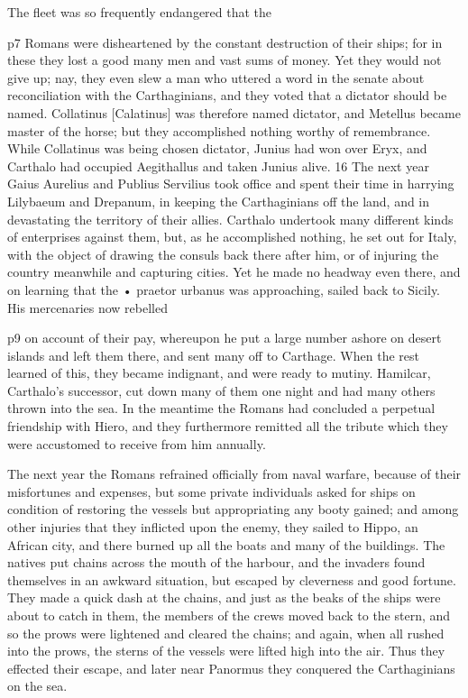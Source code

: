 The fleet was so frequently endangered that the

p7 Romans were disheartened by the constant destruction of their ships; for in these they lost a good many men and vast sums of money. Yet they would not give up; nay, they even slew a man who uttered a word in the senate about reconciliation with the Carthaginians, and they voted that a dictator should be named. Collatinus [Calatinus] was therefore named dictator, and Metellus became master of the horse; but they accomplished nothing worthy of remembrance. While Collatinus was being chosen dictator, Junius had won over Eryx, and Carthalo had occupied Aegithallus and taken Junius alive. 16
The next year Gaius Aurelius and Publius Servilius took office and spent their time in harrying Lilybaeum and Drepanum, in keeping the Carthaginians off the land, and in devastating the territory of their allies. Carthalo undertook many different kinds of enterprises against them, but, as he accomplished nothing, he set out for Italy, with the object of drawing the consuls back there after him, or of injuring the country meanwhile and capturing cities. Yet he made no headway even there, and on learning that the
\texthebrew{•} praetor urbanus was approaching, sailed back to Sicily. His mercenaries now rebelled

p9 on account of their pay, whereupon he put a large number ashore on desert islands and left them there, and sent many off to Carthage. When the rest learned of this, they became indignant, and were ready to mutiny. Hamilcar, Carthalo's successor, cut down many of them one night and had many others thrown into the sea. In the meantime the Romans had concluded a perpetual friendship with Hiero, and they furthermore remitted all the tribute which they were accustomed to receive from him annually.

The next year the Romans refrained officially from naval warfare, because of their misfortunes and expenses, but some private individuals asked for ships on condition of restoring the vessels but appropriating any booty gained; and among other injuries that they inflicted upon the enemy, they sailed to Hippo, an African city, and there burned up all the boats and many of the buildings. The natives put chains across the mouth of the harbour, and the invaders found themselves in an awkward situation, but escaped by cleverness and good fortune. They made a quick dash at the chains, and just as the beaks of the ships were about to catch in them, the members of the crews moved back to the stern, and so the prows were lightened and cleared the chains; and again, when all rushed into the prows, the sterns of the vessels were lifted high into the air. Thus they effected their escape, and later near Panormus they conquered the Carthaginians on the sea.

